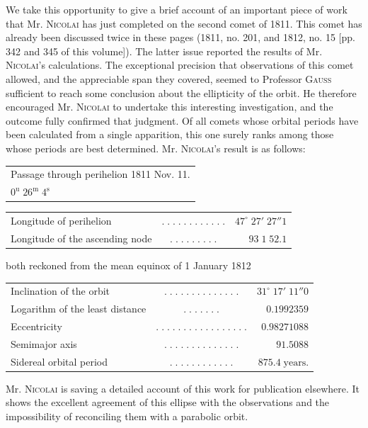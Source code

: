 \par\indent We take this opportunity to give a brief account of an important piece of work that Mr. \textsc{Nicolai} has just completed on the second comet of 1811. This comet has already been discussed twice in these pages (1811, no. 201, and 1812, no. 15 [pp. 342 and 345 of this volume]). The latter issue reported the results of Mr. \textsc{Nicolai}’s calculations. The exceptional precision that observations of this comet allowed, and the appreciable span they covered, seemed to Professor \textsc{Gauss} sufficient to reach some conclusion about the ellipticity of the orbit. He therefore encouraged Mr. \textsc{Nicolai} to undertake this interesting investigation, and the outcome fully confirmed that judgment. Of all comets whose orbital periods have been calculated from a single apparition, this one surely ranks among those whose periods are best determined. Mr. \textsc{Nicolai}’s result is as follows:

\medskip
\begin{center}\fontsize{10}{12}\selectfont\setlength{\tabcolsep}{2pt}\renewcommand{\arraystretch}{1.15}\begin{tabular}{l}
Passage through perihelion 1811 Nov. 11.\\$0^{\mathrm u}\;26^{\mathrm m}\;4^{\mathrm s}$
\end{tabular}\end{center}
\begin{center}\fontsize{9}{11}\selectfont\setlength{\tabcolsep}{2pt}\renewcommand{\arraystretch}{1.15}\begin{tabular}{lcr}
Longitude of perihelion & $.\;.\;.\;.\;.\;.\;.\;.\;.\;.\;.\;.$ & $47^\circ\;27'\;27''1$\\
Longitude of the ascending node & $.\;.\;.\;.\;.\;.\;.\;.\;.$ & $93\;1\;52.1$\\
\end{tabular}\end{center}
\noindent both reckoned from the mean equinox of 1 January 1812
\begin{center}\fontsize{9}{11}\selectfont\setlength{\tabcolsep}{2pt}\renewcommand{\arraystretch}{1.15}\begin{tabular}{lcr}
Inclination of the orbit & $.\;.\;.\;.\;.\;.\;.\;.\;.\;.\;.\;.\;.\;.$ & $31^\circ\;17'\;11''0$\\
Logarithm of the least distance & $.\;.\;.\;.\;.\;.\;.$ & $0.1992359$\\
Eccentricity & $.\;.\;.\;.\;.\;.\;.\;.\;.\;.\;.\;.\;.\;.\;.\;.\;.$ & $0.98271088$\\
Semimajor axis & $.\;.\;.\;.\;.\;.\;.\;.\;.\;.\;.\;.\;.\;.$ & $91.5088$\\
Sidereal orbital period & $.\;.\;.\;.\;.\;.\;.\;.\;.\;.\;.\;.$ & $875.4\;\text{years.}$\\
\end{tabular}\end{center}

\par\indent Mr. \textsc{Nicolai} is saving a detailed account of this work for publication elsewhere. It shows the excellent agreement of this ellipse with the observations and the impossibility of reconciling them with a parabolic orbit.
